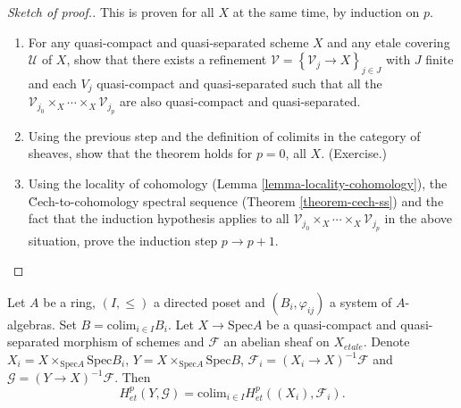 \begin{proof}[Sketch of proof.]
This is proven for all $X$ at the same time, by induction on $p$.
\begin{enumerate}
\item
For any quasi-compact and quasi-separated scheme $X$ and any etale covering
$\mathcal{U}$ of $X$, show that there exists a refinement $\mathcal{V}
=\left\{\mathcal{V}_j \to X\right\}_{j\in J}$ with $J$ finite and each $V_j$
quasi-compact and quasi-separated such that all the $\mathcal{V}_{j_0} \times_X
\cdots \times_X \mathcal{V}_{j_p}$ are also quasi-compact and quasi-separated.
\item
Using the previous step and the definition of colimits in the category of
sheaves, show that the theorem holds for $p=0$, all $X$. (Exercise.)
\item
Using the locality of cohomology
(Lemma \ref{lemma-locality-cohomology}),
the \u Cech-to-cohomology spectral sequence
(Theorem \ref{theorem-cech-ss}) and the fact that the induction
hypothesis applies to all $\mathcal{V}_{j_0}\times_X \cdots \times_X
\mathcal{V}_{j_p}$ in the above situation, prove the induction step $p\to p+1$.
\end{enumerate}
\end{proof}

\begin{theorem}
\label{theorem-directed-colimit-cohomology}
Let $A$ be a ring, $(I, \leq)$ a directed poset and $(B_i, \varphi_{ij})$ a
system of $A$-algebras. Set $B=\text{colim}_{i\in I} B_i$. Let $X \to
\text{Spec} A$ be a quasi-compact and quasi-separated morphism of schemes and
$\mathcal{F}$ an abelian sheaf on $X_{etale}$. Denote $X_i = 
X\times_{\text{Spec}
A} \text{Spec} B_i$, $Y= X \times_{\text{Spec} A}\text{Spec} B$,
$\mathcal{F}_i = (X_i\to X)^{-1}\mathcal{F}$ and $\mathcal{G} = (Y\to
X)^{-1}\mathcal{F}$. Then
$$
H_{et}^p(Y, \mathcal{G}) = \text{colim}_{i\in I} H_{et}^p ((X_i),
\mathcal{F}_i).
$$
\end{theorem}

